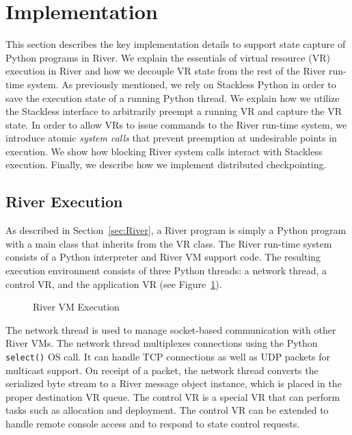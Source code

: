 \section{Implementation}
\label{sec:Implementation}

This section describes the key implementation details to support state capture of Python programs in River.  We explain the essentials of virtual resource (VR) execution in River and how we decouple VR state from the rest of the River run-time system.  As previously mentioned, we rely on Stackless Python in order to save the execution state of a running Python thread.  We explain how we utilize the Stackless interface to arbitrarily preempt a running VR and capture the VR state.  In order to allow VRs to issue commands to the River run-time system, we introduce atomic {\it system calls} that prevent preemption at undesirable points in execution.  We show how blocking River system calls interact with Stackless execution.  Finally, we describe how we implement distributed checkpointing.

\subsection{River Execution}

As described in Section~\ref{sec:River}, a River program is simply a Python program with a main class that inherits from the VR class.  The River run-time system consists of a Python interpreter and River VM support code.  The resulting execution environment consists of three Python threads: a network thread, a control VR, and the application VR (see Figure~\ref{fig:river-vm}). 

\begin{figure}[htb]
\centering{}
\caption{River VM Execution}\label{fig:river-vm}
\end{figure}

The network thread is used to manage socket-based communication with other River VMs.  The network thread multiplexes connections using the Python \verb+select()+ OS call.  It can handle TCP connections as well as UDP packets for multicast support.  On receipt of a packet, the network thread converts the serialized byte stream to a River message object instance, which is placed in the proper destination VR queue.  The control VR is a special VR that can perform tasks such as allocation and deployment.  The control VR can be extended to handle remote console access and to respond to state control requests.

